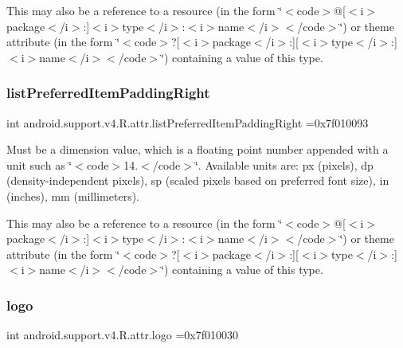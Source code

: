 This may also be a reference to a resource (in the form \char`\"{}$<$code$>$@\mbox{[}$<$i$>$package$<$/i$>$\+:\mbox{]}$<$i$>$type$<$/i$>$\+:$<$i$>$name$<$/i$>$$<$/code$>$\char`\"{}) or theme attribute (in the form \char`\"{}$<$code$>$?\mbox{[}$<$i$>$package$<$/i$>$\+:\mbox{]}\mbox{[}$<$i$>$type$<$/i$>$\+:\mbox{]}$<$i$>$name$<$/i$>$$<$/code$>$\char`\"{}) containing a value of this type. \mbox{\label{classandroid_1_1support_1_1v4_1_1R_1_1attr_a5ad6e202e34a514ac5dcd675d76d5062}} 
\subsubsection{\texorpdfstring{list\+Preferred\+Item\+Padding\+Right}{listPreferredItemPaddingRight}}
{\footnotesize\ttfamily int android.\+support.\+v4.\+R.\+attr.\+list\+Preferred\+Item\+Padding\+Right =0x7f010093\hspace{0.3cm}{\ttfamily [static]}}

Must be a dimension value, which is a floating point number appended with a unit such as \char`\"{}$<$code$>$14.\+5sp$<$/code$>$\char`\"{}. Available units are\+: px (pixels), dp (density-\/independent pixels), sp (scaled pixels based on preferred font size), in (inches), mm (millimeters). 

This may also be a reference to a resource (in the form \char`\"{}$<$code$>$@\mbox{[}$<$i$>$package$<$/i$>$\+:\mbox{]}$<$i$>$type$<$/i$>$\+:$<$i$>$name$<$/i$>$$<$/code$>$\char`\"{}) or theme attribute (in the form \char`\"{}$<$code$>$?\mbox{[}$<$i$>$package$<$/i$>$\+:\mbox{]}\mbox{[}$<$i$>$type$<$/i$>$\+:\mbox{]}$<$i$>$name$<$/i$>$$<$/code$>$\char`\"{}) containing a value of this type. \mbox{\label{classandroid_1_1support_1_1v4_1_1R_1_1attr_a5b5fc6d210aa9218c697c43ca20f6fdf}} 
\subsubsection{\texorpdfstring{logo}{logo}}
{\footnotesize\ttfamily int android.\+support.\+v4.\+R.\+attr.\+logo =0x7f010030\hspace{0.3cm}{\ttfamily [static]}}

